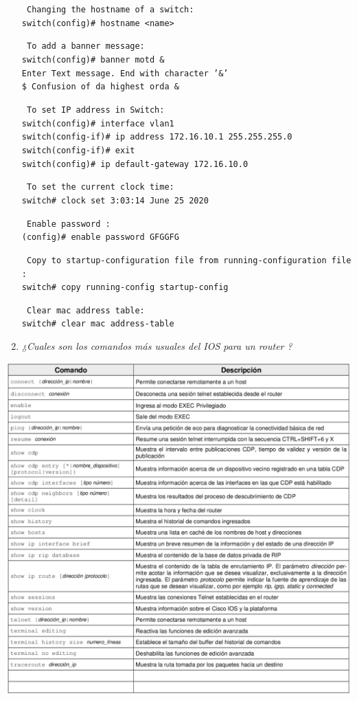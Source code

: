 \begin{enumerate}
\texttt{
Changing the hostname of a switch:\\ 
switch(config)\# hostname <name> \\
}

\texttt{
To add a banner message: \\
switch(config)\# banner motd \& \\
Enter Text message. End with character '\&' \\
\$ Confusion of da highest orda \& \\
}

\texttt{
To set IP address in Switch: \\
switch(config)\# interface vlan1 \\
switch(config-if)\# ip address 172.16.10.1 255.255.255.0 \\
switch(config-if)\# exit \\
switch(config)\# ip default-gateway 172.16.10.0 \\
}

\texttt{
To set the current clock time: \\
switch\# clock set 3:03:14 June 25 2020}

\texttt{
Enable password :\\
(config)\# enable password GFGGFG
}

\texttt{
Copy to startup-configuration file from running-configuration file :\\
switch\# copy running-config startup-config
}

\texttt{
Clear mac address table: \\
switch\# clear mac address-table
}
 
\item {\color{red}\textit{¿Cuales son los comandos más usuales del IOS para un router ?}}
\end{enumerate}
\begin{center}
\includegraphics[scale=1]{Imagenes/router.png}
\end{center}

